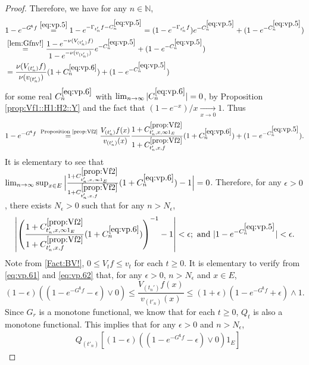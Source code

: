\documentclass[12pt,a4paper]{amsart}
\numberwithin{equation}{section}
\theoremstyle{plain}
\theoremstyle{definition}
\theoremstyle{remark}
\begin{document}
\begin{proof}
	
Therefore, we have for any $n \in \mathbb N$,
\begin{align}
	& 1 - e^{- G^{\mathbf t}f}
	\overset{\eqref{eq:vp.5}}= 1 - e^{- \Gamma_{t'_n} f  - C^{\eqref{eq:vp.5}}_n}
	= (1 - e^{- \Gamma_{t'_n} f }) e^{- C^{\eqref{eq:vp.5}}_n} + (1 - e^{-C_n^{\eqref{eq:vp.5}}})
	\\&\overset{\eqref{lem:Gfnv!}}= \frac{1 - e^{- \nu( V_{(t_n')}f)}}{1- e^{- \nu(v_{(t_n')})}}  e^{ - C^{\eqref{eq:vp.5}}_n} + (1 - e^{-C_n^{\eqref{eq:vp.5}}})
	\\& \label{eq:vp.6}= \frac{\nu (V_{(t_n')} f)}{\nu(v_{(t_n')})}  (1+C^{\eqref{eq:vp.6}}_n) + (1 - e^{-C_n^{\eqref{eq:vp.5}}})
\end{align}
	for some real $C^{\eqref{eq:vp.6}}_n$ with $\lim_{n\to \infty} |C^{\eqref{eq:vp.6}}_n| =0$, by Proposition \ref{prop:Vf1::H1:H2::Y} and the fact that $(1- e^{-x})/x \xrightarrow[x\to 0]{}1$.
	Thus
\begin{equation} \label{eq:vp.61}
	1 - e^{- G^{\mathbf t}f}
	\overset{\text{ Proposition \ref{prop:Vf2}}}=  \frac{V_{(t_n')}f(x)}{v_{(t_n')}(x)} \frac{1+C^{\ref{prop:Vf2}}_{t_n',x,\infty 1_E}}{1+C^{\ref{prop:Vf2}}_{t_n',x,f}} (1+C^{\eqref{eq:vp.6}}_n) + (1 - e^{-C_n^{\eqref{eq:vp.5}}}).
\end{equation}
	It is elementary to see that $\lim_{n\to \infty} \sup_{x\in E} \Big|\frac{1+C^{\ref{prop:Vf2}}_{t_n',x,\infty 1_E}}{1+C^{\ref{prop:Vf2}}_{t_n',x,f}} (1+C^{\eqref{eq:vp.6}}_n) -1 \Big| = 0$.
	Therefore, for any $\epsilon > 0$, there exists $N_\epsilon>0$ such that for any $n>N_\epsilon$,
\begin{equation} \label{eq:vp.62}
	\left| \left(\frac{1+C^{\ref{prop:Vf2}}_{t_n',x,\infty  1_E}}{1+C^{\ref{prop:Vf2}}_{t_n',x,f}} (1+C^{\eqref{eq:vp.6}}_n)\right)^{-1} -1 \right| < \epsilon;
	\text{~and~} |1 - e^{-C_n^{\eqref{eq:vp.5}}}| < \epsilon.
\end{equation}
	Note from \eqref{Fact:BV!}, $0 \leq V_tf \leq v_t$ for each $t\geq 0$.
	It is elementary to verify from \eqref{eq:vp.61} and \eqref{eq:vp.62} that, for any $\epsilon>0$, $n>N_\epsilon$ and $x\in E$,
\[
	(1-\epsilon) \left((1 - e^{- G^{\mathbf t}f} - \epsilon)\vee 0\right)
	\leq \frac{V_{(t_n')}f(x)}{v_{(t'_n)}(x)}
	\leq (1+\epsilon) ( 1 - e^{- G^{\mathbf t}f} + \epsilon) \wedge 1.
\]
	Since $G_r$ is a monotone functional, we know that for each $t\geq 0$, $Q_t$ is also a monotone functional.
	This implies that  for any $\epsilon>0$ and $n>N_\epsilon$,
\begin{align} \label{eq:vp.7}
	&Q_{(t'_n)} \left[(1-\epsilon) \left((1 - e^{- G^{\mathbf t}f} - \epsilon)\vee 0\right)  1_E \right]

\end{align}
\end{proof}
\end{document}
